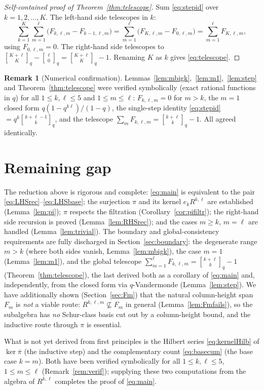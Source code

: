 \documentclass{amsart}
\theoremstyle{definition}
\newtheorem{remark}{Remark}
\newcommand{\qbin}[2]{\genfrac{[}{]}{0pt}{}{#1}{#2}_q}
\newcommand{\rkl}{R^{k,\ell}}
\newcommand{\Rklm}{R^{k,\ell,m}}
\begin{document}
\begin{proof}[Self-contained proof of Theorem~\ref{thm:telescope}]
Sum \eqref{eq:stepid} over $k=1,2,\dots,K$. The left-hand side telescopes in $k$:
\[
\sum_{k=1}^{K}\sum_{m=1}^{\ell}\big(F_{k,\ell,m}-F_{k-1,\ell,m}\big)
=\sum_{m=1}^{\ell}\big(F_{K,\ell,m}-F_{0,\ell,m}\big)
=\sum_{m=1}^{\ell}F_{K,\ell,m},
\]
using $F_{0,\ell,m}=0$. The right-hand side telescopes to
$\qbin{K+\ell}{K}-\qbin{\ell}{0}=\qbin{K+\ell}{K}-1$. Renaming $K$ as $k$ gives
\eqref{eq:telescope}.
\end{proof}

\begin{remark}[Numerical confirmation]\label{rem:telnum}
Lemmas~\ref{lem:mbigk},~\ref{lem:m1},~\ref{lem:step} and
Theorem~\ref{thm:telescope} were verified symbolically (exact rational functions in
$q$) for all $1\le k,\ell\le5$ and $1\le m\le\ell$: $F_{k,\ell,m}=0$ for $m>k$, the
$m=1$ closed form $q(1-q^{k\ell})/(1-q)$, the single-step identity \eqref{eq:stepid}
$=q^k\qbin{k+\ell-1}{k}$, and the telescope $\sum_m F_{k,\ell,m}=\qbin{k+\ell}{k}-1$.
All agreed identically.
\end{remark}

\section*{Remaining gap}

The reduction above is rigorous and complete: \eqref{eq:main} is equivalent to the
pair \eqref{eq:LHSrec}--\eqref{eq:LHSbase}; the surjection $\pi$ and its kernel
$e_k\rkl$ are established (Lemma~\ref{lem:pi}); $\pi$ respects the filtration
(Corollary~\ref{cor:pifiltr}); the right-hand side recursion is proved
(Lemma~\ref{lem:RHSrec}); and the cases $m\ge k$, $m=\ell$ are handled
(Lemma~\ref{lem:trivial}). The boundary and global-consistency requirements are
fully discharged in Section~\ref{sec:boundary}: the degenerate range $m>k$ (where
both sides vanish, Lemma~\ref{lem:mbigk}), the case $m=1$
(Lemma~\ref{lem:m1}), and the global telescope
$\sum_{m=1}^{\ell}F_{k,\ell,m}=\qbin{k+\ell}{k}-1$
(Theorem~\ref{thm:telescope}), the last derived both as a corollary of
\eqref{eq:main} and, independently, from the closed form via $q$-Vandermonde
(Lemma~\ref{lem:step}). We have additionally shown
(Section~\ref{sec:Fm}) that the natural column-height span $F_m$ is \emph{not} a
viable route: $\Rklm\not\subseteq F_m$ in general (Lemma~\ref{lem:Fmfails}), so the
subalgebra has \emph{no} Schur-class basis cut out by a column-height bound, and the
inductive route through $\pi$ is essential.

What is not yet derived from first principles is the
Hilbert series \eqref{eq:kernelHilb} of $\ker\overline\pi$ (the inductive step) and
the complementary count \eqref{eq:basecum} (the base case $k=m$). Both have been
verified symbolically for all $1\le k,\ell\le5$, $1\le m\le\ell$
(Remark~\ref{rem:verif}); supplying these two computations from the algebra of
$\rkl$ completes the proof of \eqref{eq:main}.
\end{document}
